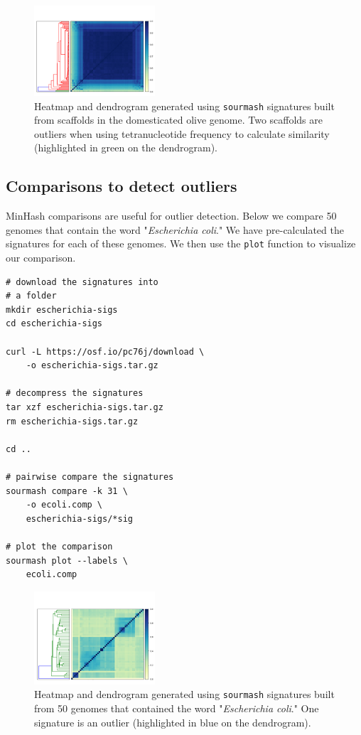 \documentclass[10pt,a4paper,twocolumn]{article}
\begin{document}
\begin{figure}
\centering
\includegraphics[width=0.4\textwidth]{olive_genome_heatmap.pdf}
\caption{\label{fig:olive_genome_heatmap} Heatmap and dendrogram generated using \lstinline{sourmash} signatures built from scaffolds in the domesticated olive genome. Two scaffolds are outliers when using tetranucleotide frequency to calculate similarity (highlighted in green on the dendrogram).}
\end{figure}

\subsection*{Comparisons to detect outliers}

MinHash comparisons are useful for outlier detection. Below we compare 50 genomes that contain the word "\textit{Escherichia coli}." We have pre-calculated the signatures for each of these genomes. We then use the \lstinline{plot} function to visualize our comparison.

\begin{lstlisting}
# download the signatures into 
# a folder
mkdir escherichia-sigs
cd escherichia-sigs

curl -L https://osf.io/pc76j/download \ 
    -o escherichia-sigs.tar.gz    

# decompress the signatures
tar xzf escherichia-sigs.tar.gz
rm escherichia-sigs.tar.gz

cd ..

# pairwise compare the signatures
sourmash compare -k 31 \ 
    -o ecoli.comp \ 
    escherichia-sigs/*sig
    
# plot the comparison
sourmash plot --labels \ 
    ecoli.comp
\end{lstlisting}

\begin{figure}
\centering
\includegraphics[width=0.4\textwidth]{compmatrix.pdf}
\caption{\label{fig:compmatrix} Heatmap and dendrogram generated using \lstinline{sourmash} signatures built from 50 genomes that contained the word "\textit{Escherichia coli}." One signature is an outlier (highlighted in blue on the dendrogram).}
\end{figure}
\end{document}
